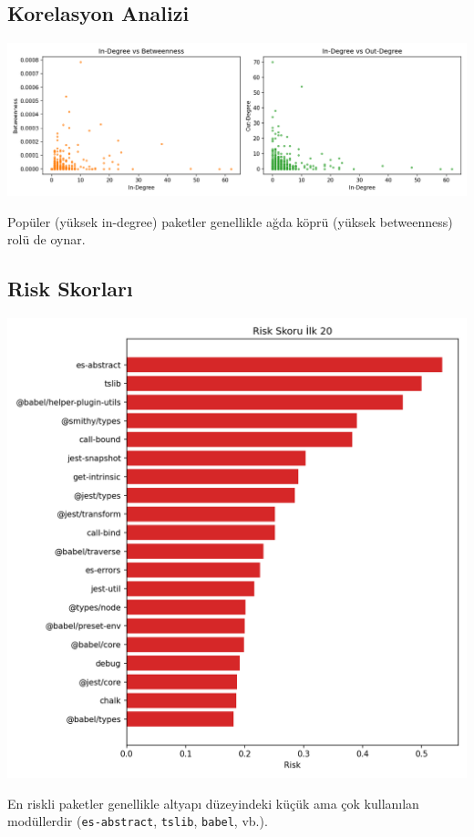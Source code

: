 \documentclass[11pt,a4paper]{article}
\begin{document}
\subsection{Korelasyon Analizi}
\includegraphics{scatter_correlations.png}
\begin{tipbox}
Popüler (yüksek in-degree) paketler genellikle ağda köprü (yüksek betweenness) rolü de oynar.
\end{tipbox}

\subsection{Risk Skorları}
\includegraphics{top20_risk.png}
\begin{tipbox}
En riskli paketler genellikle altyapı düzeyindeki küçük ama çok kullanılan modüllerdir (\texttt{es-abstract}, \texttt{tslib}, \texttt{babel}, vb.).
\end{tipbox}
\end{document}
